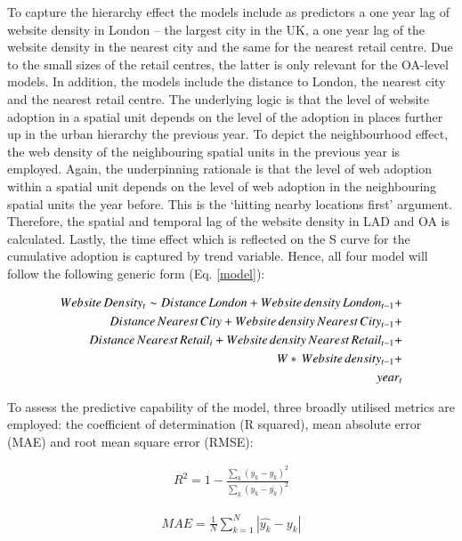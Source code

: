 \documentclass[
  authoryear,
  preprint,
  3p]{elsarticle}
\begin{document}
To capture the hierarchy effect the models include as predictors a one
year lag of website density in London -- the largest city in the UK, a
one year lag of the website density in the nearest city and the same for
the nearest retail centre. Due to the small sizes of the retail centres,
the latter is only relevant for the OA-level models. In addition, the
models include the distance to London, the nearest city and the nearest
retail centre. The underlying logic is that the level of website
adoption in a spatial unit depends on the level of the adoption in
places further up in the urban hierarchy the previous year. To depict
the neighbourhood effect, the web density of the neighbouring spatial
units in the previous year is employed. Again, the underpinning
rationale is that the level of web adoption within a spatial unit
depends on the level of web adoption in the neighbouring spatial units
the year before. This is the `hitting nearby locations first' argument.
Therefore, the spatial and temporal lag of the website density in LAD
and OA is calculated. Lastly, the time effect which is reflected on the
S curve for the cumulative adoption is captured by trend variable.
Hence, all four model will follow the following generic form (Eq.
\ref{model}):

\begin{align} \label{model}
Website\,Density_{t} \sim Distance\,London +
Website\,density\,London_{t-1} +\notag\\
Distance\,Nearest\,City +
Website\,density\,Nearest\,City_{t-1} +\notag\\
Distance\,Nearest\,Retail_{i} +
Website\,density\,Nearest\,Retail_{t-1} +\notag\\
W*\, Website\,density_{t-1} +\notag\\ 
year_{t}
\end{align}

To assess the predictive capability of the model, three broadly utilised
metrics are employed: the coefficient of determination (R squared), mean
absolute error (MAE) and root mean square error (RMSE):

\begin{align}
R^2 = 1 - \frac{\sum_{k} (y_{k} - \hat{y_{k}})^2} {\sum_{k} (y_{k} - \overline{y_{k}})^2} \label{eq:rsquared}
\end{align}

\begin{align}
MAE = \frac{1}{N} \sum_{k = 1}^{N} |\hat{y_{k}} - y_{k}| \label{eq:mae}
\end{align}
\end{document}

